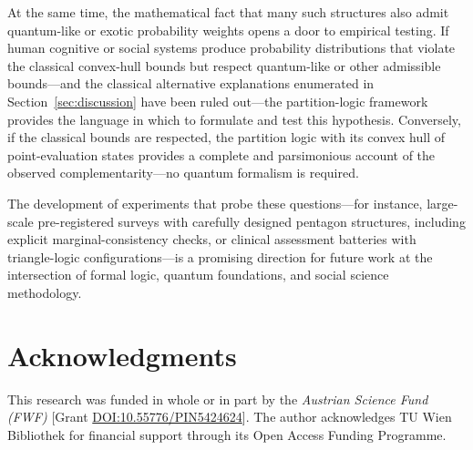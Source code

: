 \documentclass{article}
\begin{document}
At the same time, the mathematical fact that many such structures
also admit quantum-like or exotic probability weights opens a door to
empirical testing. If human cognitive or social systems produce
probability distributions that violate the classical convex-hull
bounds but respect quantum-like or other admissible bounds---and the
classical alternative explanations enumerated in
Section~\ref{sec:discussion} have been ruled out---the
partition-logic framework provides the language in which to formulate
and test this hypothesis. Conversely, if the classical bounds are
respected, the partition logic with its convex hull of
point-evaluation states provides a complete and parsimonious account
of the observed complementarity---no quantum formalism is required.

The development of experiments that probe these questions---for
instance, large-scale pre-registered surveys with carefully designed
pentagon structures, including explicit marginal-consistency checks,
or clinical assessment batteries with triangle-logic
configurations---is a promising direction for future work at the
intersection of formal logic, quantum foundations, and social
science methodology.

\section*{Acknowledgments}
This research was funded in whole or in part by the \textit{Austrian Science Fund (FWF)} [Grant \href{https://doi.org/10.55776/PIN5424624}{DOI:10.55776/PIN5424624}].
The author acknowledges TU Wien Bibliothek for financial support through its Open Access Funding Programme.

\makeatletter
\renewcommand{\bibsection}{%
  \section*{References}%
  \@mkboth{REFERENCES}{REFERENCES}%
}
\makeatother

%
%
\end{document}

